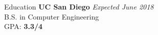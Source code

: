 \documentclass{resume}
\begin{document}
\begin{rSection}{Education}
{\bf UC San Diego} \hfill {\em Expected June 2018}
\\ B.S. in Computer Engineering
\\ GPA: {\bf 3.3/4}
\end{rSection}
\end{document}
